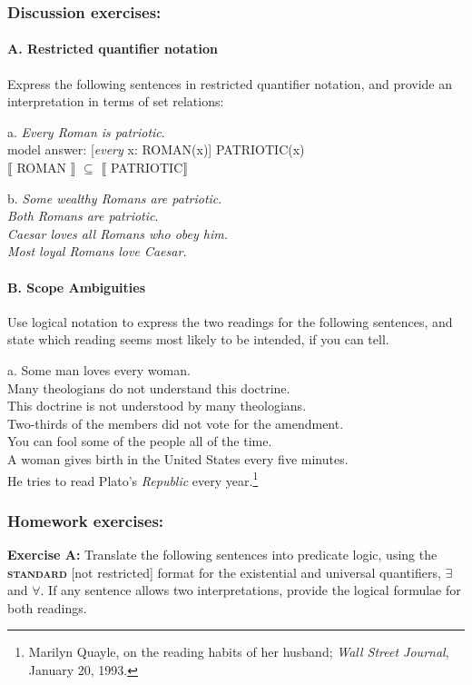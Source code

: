 \subsubsection{Discussion exercises:}\label{sec:}
\paragraph{A. Restricted quantifier notation} 

Express the following sentences in restricted quantifier notation, and provide an interpretation in terms of set relations:

\ea
  a. \textit{Every Roman is patriotic}.\\
\textsf{  model answer: [}\textsf{\textit{every}}\textsf{ x: ROMAN(x)] PATRIOTIC(x)\\} $\llbracket$ \textsf{ROMAN} $\rrbracket$ \textsf{} ${\subseteq}$\textsf{} $\llbracket$ \textsf{PATRIOTIC}$\rrbracket$ 
\z

\ea
  b. \textit{Some wealthy Romans are patriotic}.\\
\ex \textit{Both Romans are patriotic}.\\
\ex \textit{Caesar loves all Romans who obey him.}\\
\ex \textit{Most loyal Romans love Caesar.}
\z

\paragraph{B. Scope Ambiguities}

Use logical notation to express the two readings for the following sentences, and state which reading seems most likely to be intended, if you can tell.

\ea
  a. Some man loves every woman.\\
\ex Many theologians do not understand this doctrine.\\
\ex This doctrine is not understood by many theologians.\\
\ex Two-thirds of the members did not vote for the amendment.\\
\ex You can fool some of the people all of the time.\\
\ex A woman gives birth in the United States every five minutes.\\
\ex He tries to read Plato’s \textit{Republic} every year.\footnote{Marilyn Quayle, on the reading habits of her husband; \textit{Wall Street Journal}, January 20, 1993.}
\z

\subsubsection{Homework exercises:}\label{sec:}
\begin{stylepoints}
\textbf{Exercise A:} Translate the following sentences into predicate logic, using the \textbf{\textsc{standard}} [not restricted] format for the existential and universal quantifiers, ${\exists}$ and ${\forall}$. If any sentence allows two interpretations, provide the logical formulae for both readings.
\end{stylepoints}

